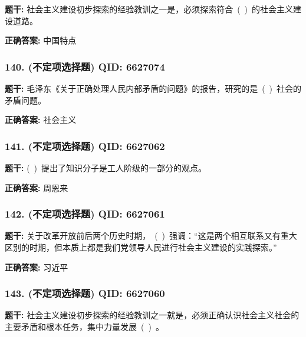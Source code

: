 \documentclass[12pt,UTF8]{ctexart}
\begin{document}
\textbf{题干:}
社会主义建设初步探索的经验教训之一是，必须探索符合 ( ) 的社会主义建设道路。

\textbf{正确答案:}
中国特点

\vspace{0.3em}\hrulefill\vspace{0.7em}

\subsubsection*{140. (不定项选择题) \small QID: 6627074}

\textbf{题干:}
毛泽东《关于正确处理人民内部矛盾的问题》的报告，研究的是 ( ) 社会的矛盾问题。

\textbf{正确答案:}
社会主义

\vspace{0.3em}\hrulefill\vspace{0.7em}

\subsubsection*{141. (不定项选择题) \small QID: 6627062}

\textbf{题干:}
( ) 提出了知识分子是工人阶级的一部分的观点。

\textbf{正确答案:}
周恩来

\vspace{0.3em}\hrulefill\vspace{0.7em}

\subsubsection*{142. (不定项选择题) \small QID: 6627061}

\textbf{题干:}
关于改革开放前后两个历史时期， ( ) 强调：“这是两个相互联系又有重大区别的时期，但本质上都是我们党领导人民进行社会主义建设的实践探索。”

\textbf{正确答案:}
习近平

\vspace{0.3em}\hrulefill\vspace{0.7em}

\subsubsection*{143. (不定项选择题) \small QID: 6627060}

\textbf{题干:}
社会主义建设初步探索的经验教训之一就是，必须正确认识社会主义社会的主要矛盾和根本任务，集中力量发展 ( ) 。
\end{document}
